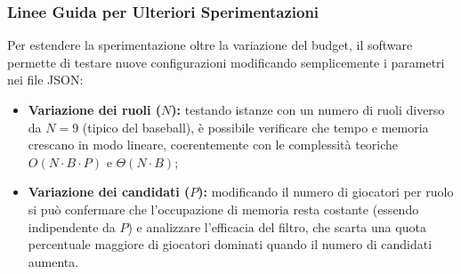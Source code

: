\subsubsection{Linee Guida per Ulteriori Sperimentazioni}
Per estendere la sperimentazione oltre la variazione del budget, il software permette di testare nuove configurazioni modificando semplicemente i parametri nei file JSON:
\begin{itemize}
	\item \textbf{Variazione dei ruoli ($N$):} testando istanze con un numero di ruoli diverso da $N = 9$ (tipico del baseball), è possibile verificare che tempo e memoria crescano in modo lineare, coerentemente con le complessità teoriche $O(N \cdot B \cdot P)$ e $\Theta(N \cdot B)$;
	\item \textbf{Variazione dei candidati ($P$):} modificando il numero di giocatori per ruolo si può confermare che l'occupazione di memoria resta costante (essendo indipendente da $P$) e analizzare l'efficacia del filtro, che scarta una quota percentuale maggiore di giocatori dominati quando il numero di candidati aumenta.
\end{itemize}

\newpage
